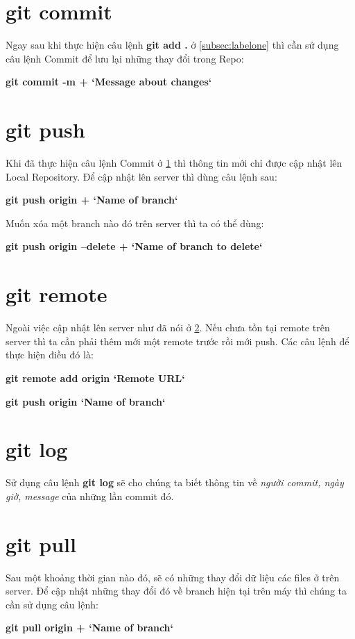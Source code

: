 \documentclass[a4paper]{report}
\begin{document}
\section{git commit}
\label{subsec:labeltwo}
\textrm{Ngay sau khi thực hiện câu lệnh \textbf{git add .} ở
\ref{subsec:labelone} thì cần sử dụng câu lệnh Commit để lưu lại những thay đổi trong Repo:}
\newline
\centerline{\textbf{git commit -m + `Message about changes`}}

\section{git push}
\label{subsec:labelthree}
\textrm{Khi đã thực hiện câu lệnh Commit ở \ref{subsec:labeltwo} thì thông tin mới chỉ được cập nhật lên Local Repository.}
\newline
\textrm{Để cập nhật lên server thì dùng câu lệnh sau:}
\newline
\centerline{\textbf{git push origin + `Name of branch`}}
\newline
\textrm{Muốn xóa một branch nào đó trên server thì ta có thể dùng:}
\newline
\centerline{\textbf{git push origin --delete + `Name of branch to delete`}}

\section{git remote}
\textrm{Ngoài việc cập nhật lên server như đã nói ở \ref{subsec:labelthree}. Nếu chưa tồn tại remote trên server thì ta cần phải thêm mới một remote trước rồi mới push.}
\newline
\textrm{Các câu lệnh để thực hiện điều đó là:}
\newline
\centerline{\textbf{git remote add origin `Remote URL`}}
\newline
\centerline{\textbf{git push origin `Name of branch`}}

\section{git log}
\textrm{Sử dụng câu lệnh \textbf{git log} sẽ cho chúng ta biết thông tin về \textit{người commit, ngày giờ, message} của những lần commit đó.}

\section{git pull}
\textrm{Sau một khoảng thời gian nào đó, sẽ có những thay đổi dữ liệu các files ở trên server. Để cập nhật những thay đổi đó về branch hiện tại trên máy thì chúng ta cần sử dụng câu lệnh:}
\newline
\centerline{\textbf{git pull origin + `Name of branch`}}
\end{document}

